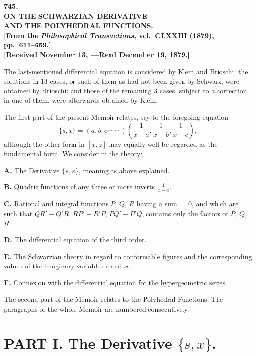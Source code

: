 \documentclass[11pt,a4paper]{article}
\theoremstyle{plain}
\begin{document}
\begin{center}
\Large\bfseries 745.\\[6pt]
\Large\bfseries ON THE SCHWARZIAN DERIVATIVE\\
\Large\bfseries AND THE POLYHEDRAL FUNCTIONS.\\[12pt]
\normalsize
[From the \textit{Philosophical Transactions}, vol.~CLXXIII (1879),\\
pp.~611--659.]\\[12pt]
\small
[Received November 13, ---Read December 19, 1879.]
\end{center}

\normalsize


The last-mentioned differential equation is considered by Klein and Brioschi:
the solutions in 13 cases, or such of them as had not been given by Schwarz,
were obtained by Brioschi: and those of the remaining 3 cases, subject to
a correction in one of them, were afterwards obtained by Klein.

The first part of the present Memoir relates, say to the foregoing equation
\[
\{s, x\} = (a, b, c \frown \frown) \left(\frac{1}{x-a}, \frac{1}{x-b}, \frac{1}{x-c}\right),
\]
although the other form in $[x, z]$ may equally well be regarded as the
fundamental form. We consider in the theory:

\textbf{A.} The Derivative $\{s, x\}$, meaning as above explained.

\textbf{B.} Quadric functions of any three or more inverts $\frac{1}{x-a}$.

\textbf{C.} Rational and integral functions $P$, $Q$, $R$ having a sum $=0$,
and which are such that $QR' - Q'R$, $RP' - R'P$, $PQ' - P'Q$, contains
only the factors of $P$, $Q$, $R$.

\textbf{D.} The differential equation of the third order.

\textbf{E.} The Schwarzian theory in regard to conformable figures and the
corresponding values of the imaginary variables $s$ and $x$.

\textbf{F.} Connexion with the differential equation for the hypergeometric
series.

The second part of the Memoir relates to the Polyhedral Functions.
The paragraphs of the whole Memoir are numbered consecutively.

\section*{PART I. The Derivative $\{s, x\}$.}
\end{document}
